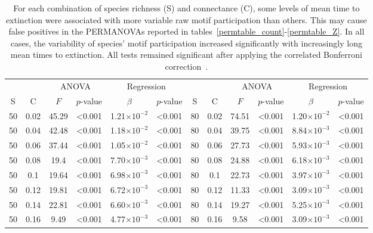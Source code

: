 \documentclass[12pt]{article}
\begin{document}
\begin{spacing}{2.0}
		\begin{table}[h!]
			\caption{For each combination of species richness (S) and connectance (C), some levels of mean time to extinction were associated with more variable raw motif participation than others. This may cause false positives in the PERMANOVAs reported in tables~\ref{permtable_count}-\ref{permtable_Z}. In all cases, the variability of species' motif participation increased significantly with increasingly long mean times to extinction. All tests remained significant after applying the correlated Bonferroni correction~\citep{Drezner2016}.}
			\label{betadisp_count}
			\footnotesize
			\begin{tabular}{c c | c c| c c ||c c | c c | c c |}
				&		&	\multicolumn{2}{c|}{ANOVA}	&\multicolumn{2}{c||}{Regression} 			& & & 	\multicolumn{2}{c|}{ANOVA}		 	&	 \multicolumn{2}{c|}{Regression} 			\\
	            S	&	C	&	$F$	&	$p$-value	&	$\beta$	&	$p$-value	&	S	&	C	&	$F$	&	$p$-value	&	$\beta$	&	$p$-value	\\
				\hline
                50  & 0.02  & 45.29 & \textless0.001 & 1.21$\times10^{-2}$ & \textless0.001 & 80  & 0.02  & 74.51 & \textless0.001 & 1.20$\times10^{-2}$ & \textless0.001 \\
                50  & 0.04  & 42.48 & \textless0.001 & 1.18$\times10^{-2}$ & \textless0.001 & 80  & 0.04  & 39.75 & \textless0.001 & 8.84$\times10^{-3}$ & \textless0.001 \\
                50  & 0.06  & 37.44 & \textless0.001 & 1.05$\times10^{-2}$ & \textless0.001 & 80  & 0.06  & 27.73 & \textless0.001 & 5.93$\times10^{-3}$ & \textless0.001 \\
                50  & 0.08  & 19.4  & \textless0.001 & 7.70$\times10^{-3}$ & \textless0.001 & 80  & 0.08  & 24.88 & \textless0.001 & 6.18$\times10^{-3}$ & \textless0.001 \\
                50  & 0.1 & 19.64 & \textless0.001 & 6.98$\times10^{-3}$ & \textless0.001 & 80  & 0.1 & 22.73 & \textless0.001 & 3.97$\times10^{-3}$ & \textless0.001 \\
                50  & 0.12  & 19.81 & \textless0.001 & 6.72$\times10^{-3}$ & \textless0.001 & 80  & 0.12  & 11.33 & \textless0.001 & 3.09$\times10^{-3}$ & \textless0.001 \\
                50  & 0.14  & 22.81 & \textless0.001 & 6.60$\times10^{-3}$ & \textless0.001 & 80  & 0.14  & 19.27 & \textless0.001 & 5.25$\times10^{-3}$ & \textless0.001 \\
                50  & 0.16  & 9.49  & \textless0.001 & 4.77$\times10^{-3}$ & \textless0.001 & 80  & 0.16  & 9.58  & \textless0.001 & 3.09$\times10^{-3}$ & \textless0.001 \\

\end{tabular}
\end{table}
\end{spacing}
\end{document}
